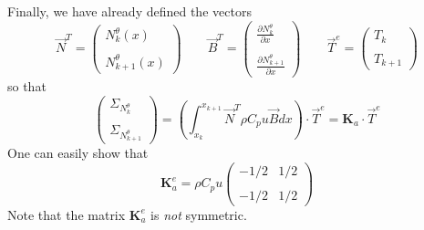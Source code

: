 Finally, we have already defined the vectors 
\[
{\vec N}^T = 
\left(
\begin{array}{c}
N_k^\theta(x)  \\ \\  N_{k+1}^\theta (x)
\end{array}
\right)
\quad\quad
{\vec B}^T=
\left(
\begin{array}{cc}
 \frac{\partial N_k^\theta}{\partial x}   \\ \\
 \frac{\partial N_{k+1}^\theta}{\partial x}
\end{array}
\right)
\quad
\quad
{\vec T}^e = 
\left(
\begin{array}{c}
T_k \\ \\ T_{k+1}
\end{array}
\right)
\]
so that 
\[
\left(
\begin{array}{c}
{\Sigma}_{N_k^\theta} \\  \\ {\Sigma}_{N_{k+1}^\theta}
\end{array}
\right)
=
\left( \int_{x_k}^{x_{k+1}}   {\vec N}^T \rho C_p u {\vec B} dx  \right) \cdot {\vec T}^e
= {\bm K}_a \cdot \vec T^e
\]
One can easily show that 
\[
{\bm K}_a^e=
\rho C_p u
\left(
\begin{array}{cc}
-1/2 & 1/2 \\ \\
-1/2 & 1/2 
\end{array}
\right)
\]
Note that the matrix ${\bm K}_a^e$ is {\sl not} symmetric. 

